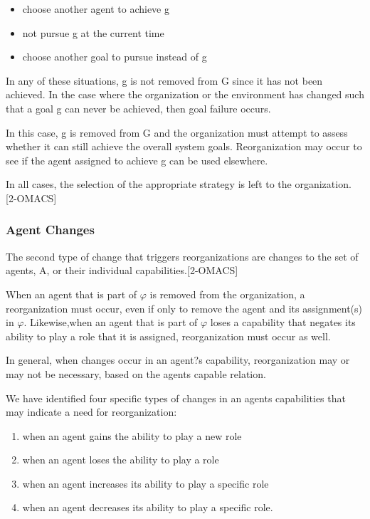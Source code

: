 \begin{itemize}
\item  choose another agent to achieve g
\item  not pursue g at the current time
\item  choose another goal to pursue instead of g
\end{itemize}	
 
In any of these situations, g is not removed from G since it has not been achieved. In the case where the organization or the environment has changed such that a goal g can never be achieved, then goal failure occurs. 

In this case, g is removed from G and the organization must attempt to assess whether it can still achieve the overall system goals. Reorganization may occur to see if the agent assigned to achieve g can be used elsewhere. 

In all cases, the selection of the appropriate strategy is left to the organization. [2-OMACS]

\subsubsection{Agent Changes }
The second type of change that triggers reorganizations are changes to the set of agents, A, or their individual capabilities.[2-OMACS]

When an agent that is part of $\varphi$ is removed from the organization, a reorganization must occur, even if only to remove the agent and its assignment(s) in $\varphi$. Likewise,when an agent that is part of $\varphi$ loses a capability that negates its ability to play a role that it is assigned, reorganization must occur as well. 

In general, when changes occur in an agent?s capability, reorganization may or may not be necessary, based on the agents capable relation. 

We have identified four specific types of changes in an agents capabilities that may indicate a need for reorganization: 

\begin{enumerate}
\item 
	when an agent gains the ability to play a new role
\item
	when an agent loses the ability to play a role
\item
	when an agent increases its ability to play a specific role
\item
	when an agent decreases its ability to play a specific role.
\end{enumerate}	
 
